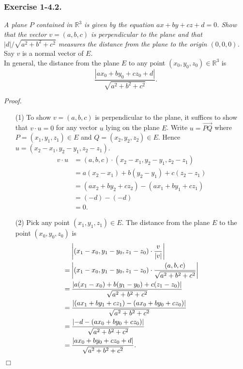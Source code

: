 \documentclass{article}
\begin{document}
\subsubsection*{Exercise 1-4.2.}
\emph{A plane $P$ contained in $\mathbb{R}^3$ is given by the equation $ax+by+cz+d=0$.
Show that the vector $v=(a,b,c)$ is perpendicular to the plane and that
$|d|/\sqrt{a^2+b^2+c^2}$ measures the distance from the plane to the origin $(0,0,0)$.} \\

Say $v$ is a normal vector of $E$. \\

In general, the distance from the plane $E$ to
any point $(x_0, y_0, z_0) \in \mathbb{R}^3$ is
$$\frac{|ax_0+by_0+cz_0+d|}{\sqrt{a^2+b^2+c^2}}.$$



\emph{Proof.}
\begin{enumerate}
\item[(1)]
  To show $v=(a,b,c)$ is perpendicular to the plane,
  it suffices to show that $v \cdot u = 0$ for any vector $u$ lying on the plane $E$.
  Write $u = \overrightarrow{PQ}$ where
  $P = (x_1, y_1, z_1) \in E$ and $Q = (x_2, y_2, z_2) \in E$.
  Hence $u = (x_2-x_1, y_2-y_1, z_2-z_1)$.
  \begin{align*}
    v \cdot u
    &= (a,b,c) \cdot (x_2-x_1, y_2-y_1, z_2-z_1) \\
    &= a(x_2-x_1) + b(y_2-y_1) + c(z_2-z_1) \\
    &= (ax_2 + by_2 + cz_2) - (ax_1 + by_1 + cz_1) \\
    &= (-d) - (-d) \\
    &= 0.
  \end{align*}

\item[(2)]
  Pick any point $(x_1,y_1,z_1) \in E$.
  The distance from the plane $E$ to the point $(x_0, y_0, z_0)$ is
  \begin{align*}
    & \: \abs{(x_1-x_0,y_1-y_0,z_1-z_0) \cdot \frac{v}{|v|}} \\
    =& \: \abs{(x_1-x_0,y_1-y_0,z_1-z_0) \cdot \frac{(a,b,c)}{\sqrt{a^2+b^2+c^2}}} \\
    =& \: \frac{\abs{a(x_1-x_0)+b(y_1-y_0)+c(z_1-z_0)}}{\sqrt{a^2+b^2+c^2}} \\
    =& \: \frac{\abs{(ax_1+by_1+cz_1) - (ax_0+by_0+cz_0)}}{\sqrt{a^2+b^2+c^2}} \\
    =& \: \frac{\abs{-d - (ax_0+by_0+cz_0)}}{\sqrt{a^2+b^2+c^2}} \\
    =& \: \frac{\abs{ax_0+by_0+cz_0+d}}{\sqrt{a^2+b^2+c^2}}.
  \end{align*}
\end{enumerate}
$\Box$ \\\\
\end{document}
